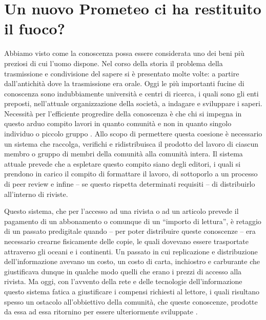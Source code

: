 \chapter{Un nuovo Prometeo ci ha restituito il fuoco?}

Abbiamo visto come la conoscenza possa essere considerata uno dei beni più preziosi di
cui l’uomo dispone. Nel corso della storia il problema della trasmissione e condivisione del
sapere si è presentato molte volte: a partire dall’antichità dove la trasmissione era orale.
Oggi le più importanti fucine di conoscenza sono indubbiamente università e centri di
ricerca, i quali sono gli enti preposti, nell’attuale organizzazione della società, a indagare e
sviluppare i saperi. Necessità per l’efficiente progredire della conoscenza è che chi si
impegna in questo arduo compito lavori in quanto comunità e non in quanto singolo individuo
o piccolo gruppo \parencite{kuhn}. Allo scopo di permettere questa coesione è
necessario un sistema che raccolga, verifichi e ridistribuisca il prodotto del lavoro di ciascun
membro o gruppo di membri della comunità alla comunità intera. Il sistema attuale prevede
che a espletare questo compito siano degli editori, i quali si prendono in carico il compito di
formattare il lavoro, di sottoporlo a un processo di peer review e infine – se questo rispetta
determinati requisiti – di distribuirlo all’interno di riviste.

Questo sistema, che per l’accesso ad una rivista o ad un articolo prevede il
pagamento di un abbonamento o comunque di un “importo di lettura”, è retaggio di un
passato predigitale quando – per poter distribuire queste conoscenze – era necessario
crearne fisicamente delle copie, le quali dovevano essere trasportate attraverso gli oceani e
i continenti. Un passato in cui replicazione e distribuzione dell’informazione avevano un
costo, un costo di carta, inchiostro e carburante che giustificava dunque in qualche modo
quelli che erano i prezzi di accesso alla rivista. Ma oggi, con l’avvento della rete e delle
tecnologie dell’informazione questo sistema fatica a giustificare i compensi richiesti al
lettore, i quali risultano spesso un ostacolo all’obbiettivo della comunità, che queste
conoscenze, prodotte da essa ad essa ritornino per essere ulteriormente sviluppate \parencite{taylor}.

